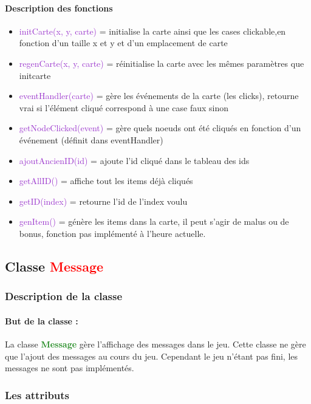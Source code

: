 \documentclass[12pt,a4paper]{report}
\begin{document}
				\paragraph{Description des fonctions}
					\begin{itemize}
						\item \textcolor{DarkOrchid}{initCarte(x, y, carte)} = initialise la carte ainsi que les cases clickable,en fonction d'un taille x et y et d'un emplacement de carte
						\item \textcolor{DarkOrchid}{regenCarte(x, y, carte)} = réinitialise la carte avec les mêmes paramètres que initcarte
						\item \textcolor{DarkOrchid}{eventHandler(carte)} = gère les événements de la carte (les clicks), retourne vrai si l'élément cliqué correspond à une case faux sinon
						\item \textcolor{DarkOrchid}{getNodeClicked(event)} = gère quels noeuds ont été cliqués en fonction d'un événement (définit dans eventHandler)
						\item \textcolor{DarkOrchid}{ajoutAncienID(id)} = ajoute l'id cliqué dans le tableau des ids
						\item \textcolor{DarkOrchid}{getAllID()} = affiche tout les items déjà cliqués
						\item \textcolor{DarkOrchid}{getID(index)} = retourne l'id de l'index voulu
						\item \textcolor{DarkOrchid}{genItem()} = génère les items dans la carte, il peut s'agir de malus ou de bonus, fonction pas implémenté à l'heure actuelle.
					\end{itemize}
				\newpage
   	 	\subsection{Classe \textcolor{red}{Message}}
			\subsubsection{Description de la classe}
				\paragraph{But de la classe : }
  	 				La classe \textbf{\textcolor{ForestGreen}{Message}} gère l'affichage des messages dans le jeu. Cette classe ne gère que l'ajout des messages au cours du jeu. 
  	 				Cependant le jeu n'étant pas fini, les messages ne sont pas implémentés.
   	 		\subsubsection{Les attributs}
\end{document}
